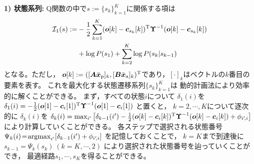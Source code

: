 \medskip
\noindent
{\bf 1) 状態系列:}
Q関数の中で$s\!:=\!\{s_k\}_{k=1}^{K}$に関係する項は
\begin{align}
\mathcal{I}_1(s):=
&
-\frac{1}{2}
\sum_{k=1}^{K}
({\textit{\boldmath $o$}}[k]-\textit{\boldmath $c$}_{s_k}[k])^{\rm T}
\textit{\boldmath $\Upsilon$}^{-1}
({\textit{\boldmath $o$}}[k]-\textit{\boldmath $c$}_{s_k}[k])
\nonumber\\
&+\log P(s_{1}) + \sum_{k=2}^{K}\log P(s_k|s_{k-1})
\end{align}
となる。ただし，
$
\textit{\boldmath $o$}[k]:=
(
[
\textit{\boldmath $A$}\bar{\textit{\boldmath $x$}}_{\rm p} 
]_{k},
[
\textit{\boldmath $B$}\bar{\textit{\boldmath $x$}}_{\rm a} 
]_{k}
)^{\rm T}
$であり，$[\cdot]_k$はベクトルの$k$番目の要素を表す。
これを最大化する状態遷移系列$\{s_{k}\}_{k=1}^{K}$は
動的計画法により効率的に解くことができる。
まず，すべての状態$i$について
$\delta_{1}(i)$を
$%
\delta_{1}(i) = 
-\frac{1}{2}
(\Vec{o}[1]-\Vec{c}_{i}[1])^{\rm T}
\Mat{\Upsilon}^{-1}
(\Vec{o}[1]-\Vec{c}_{i}[1])
$%
と置くと，
$k=2,\cdots,K$について逐次的に
$\delta_{k}(i)$を
$\delta_{k}(i)=
\max_{i'}
\big[
\delta_{k-1}(i')
-\frac{1}{2}
(\textit{\boldmath $o$}[k]-\textit{\boldmath $c$}_{i}[k])^{\rm T}
\textit{\boldmath $\Upsilon$}^{-1}
(\textit{\boldmath $o$}[k]-\textit{\boldmath $c$}_{i}[k])
+\phi_{i'\!,i}
\big]$
により計算していくことができる。
各ステップで選択される状態番号
$\Psi_{k}(i)\!=\!
\mathop{\mathrm{argmax}}_{i'}
[
\delta_{k-1}(i')
+\phi_{i'\!,i}
]$
を記憶しておくことで，
$k=K$まで到達後に
$s_{k-1}\!=\!\Psi_{k}(s_{k})~(k\!=\!K,\cdots,2)$
により選択された状態番号を辿っていくことができ，
最適経路$s_1,\cdots,s_K$を得ることができる。

